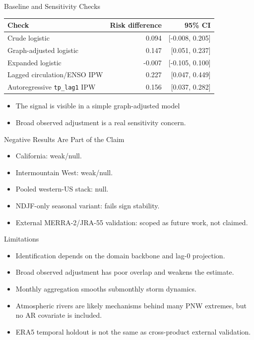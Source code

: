 \documentclass[aspectratio=169]{beamer}
\begin{document}
\begin{frame}{Baseline and Sensitivity Checks}
\centering
\begin{minipage}{0.70\textwidth}

\begin{table}
\centering
\small
\begin{tabular}{lrr}
\toprule
Check & Risk difference & 95\% CI \\
\midrule
Crude logistic & 0.094 & [-0.008, 0.205] \\
Graph-adjusted logistic & 0.147 & [0.051, 0.237] \\
Expanded logistic & -0.007 & [-0.105, 0.100] \\
Lagged circulation/ENSO IPW & 0.227 & [0.047, 0.449] \\
Autoregressive \texttt{tp\_lag1} IPW & 0.156 & [0.037, 0.282] \\
\bottomrule
\end{tabular}
\end{table}

\vspace{0.2cm}

\begin{itemize}
    \item The signal is visible in a simple graph-adjusted model
    \item Broad observed adjustment is a real sensitivity concern.
\end{itemize}

\end{minipage}

\end{frame}

\begin{frame}{Negative Results Are Part of the Claim}
\begin{itemize}
\item California: weak/null.
\item Intermountain West: weak/null.
\item Pooled western-US stack: null.
\item NDJF-only seasonal variant: fails sign stability.
\item External MERRA-2/JRA-55 validation: scoped as future work, not claimed.
\end{itemize}
\end{frame}

\begin{frame}{Limitations}
\begin{itemize}
\item Identification depends on the domain backbone and lag-0 projection.
\item Broad observed adjustment has poor overlap and weakens the estimate.
\item Monthly aggregation smooths submonthly storm dynamics.
\item Atmospheric rivers are likely mechanisms behind many PNW extremes, but no
AR covariate is included.
\item ERA5 temporal holdout is not the same as cross-product external
validation.
\end{itemize}
\end{frame}
\end{document}
